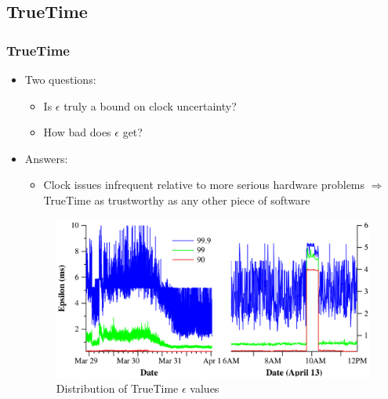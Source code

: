 \documentclass{beamer}
\begin{document}
\subsection{TrueTime}
\begin{frame}
  \frametitle{TrueTime}
  \begin{itemize}
    \item{Two questions:}
    \begin{itemize}
      \item{Is $\epsilon$ truly a bound on clock uncertainty?}
      \item{How bad does $\epsilon$ get?}
    \end{itemize}
    \pause
    \item{Answers:}
    \begin{itemize}
      \item{Clock issues infrequent relative to more serious hardware problems
      \newline $\Rightarrow$ TrueTime as trustworthy as any other piece of software
      }
    \end{itemize}
    \pause
    \begin{figure}
      \centering
      \includegraphics[width=.6\textwidth]{figures/epsilon.png}
      \caption{Distribution of TrueTime $\epsilon$ values}
    \end{figure}
  \end{itemize}
\end{frame}

\end{document}
